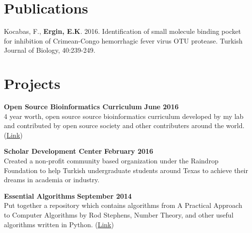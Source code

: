 \documentclass[margin,line]{res}
\begin{document}
\begin{resume}
\section{\sc Publications}
Kocabas, F., {\bf Ergin, E.K}. 2016. Identification of small molecule binding pocket for inhibition of Crimean-Congo hemorrhagic fever virus OTU protease. Turkish Journal of Biology, 40:239-249.



%

%



\section{\sc Projects}
{\bf Open Source Bioinformatics Curriculum} \hfill {\bf June  2016}\\
4 year worth, open source source bioinformatics curriculum developed by my lab and contributed by open source society and other contributers around the world. (\href{https://github.com/open-source-society/bioinformatics}{Link})

{\bf Scholar Development Center} \hfill {\bf February  2016}\\
Created a non-profit community based organization under the Raindrop Foundation to help Turkish undergraduate students around Texas to achieve their dreams in academia or industry. 

{\bf Essential Algorithms} \hfill {\bf September 2014}\\
Put together a repository which contains algorithms from A Practical Approach to Computer Algorithms by Rod Stephens, Number Theory, and other useful algorithms written in Python. (\href{https://github.com/eneskemalergin/Essential_Algorithms}{Link})



\end{resume}
\end{document}
